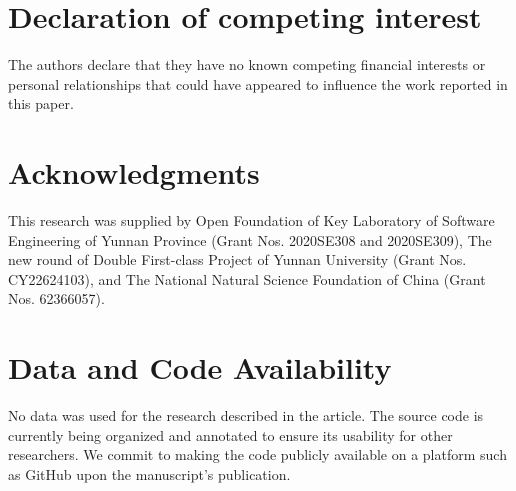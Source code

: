 \documentclass[preprint,number,sort&compress,12pt]{elsarticle}
\begin{document}
\section*{Declaration of competing interest}

\noindent The authors declare that they have no known competing financial interests or personal relationships that could have appeared to influence the work reported in this paper.

\section*{Acknowledgments}
\noindent This research was supplied by Open Foundation of Key Laboratory of Software Engineering of Yunnan Province (Grant Nos. 2020SE308 and 2020SE309), The new round of Double First-class Project of Yunnan University (Grant Nos. CY22624103), and The National Natural Science Foundation of China (Grant Nos. 62366057).

\section*{Data and Code Availability}
\noindent No data was used for the research described in the article. The source code is currently being organized and annotated to ensure its usability for other researchers. We commit to making the code publicly available on a platform such as GitHub upon the manuscript's publication.





\end{document}
